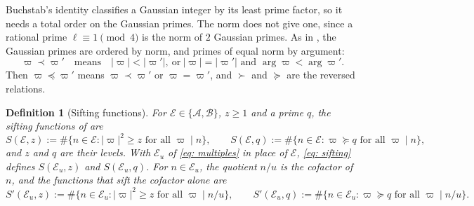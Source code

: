 \documentclass{article}
\numberwithin{equation}{section}
\newtheorem{definition}{Definition}
\newcommand{\Ge}{\geqslant}
\begin{document}
Buchstab's identity classifies a Gaussian integer by its least prime factor, so it needs a total order on the Gaussian primes. The norm does not give one, since a rational prime $\ell \equiv 1 \pmod 4$ is the norm of $2$ Gaussian primes. As in \citet[p.~122]{harman2001gaussian}, the Gaussian primes are ordered by norm, and primes of equal norm by argument:
\begin{equation}
\label{eq: order}
\varpi \prec \varpi' \quad \text{means} \quad |\varpi| < |\varpi'|, \ \text{or} \ |\varpi| = |\varpi'| \text{ and } \arg \varpi < \arg \varpi'.
\end{equation}
Then $\varpi \preccurlyeq \varpi'$ means $\varpi \prec \varpi'$ or $\varpi = \varpi'$, and $\succ$ and $\succcurlyeq$ are the reversed relations.

\begin{definition}[Sifting functions]
\label{def: sifting}
For $\mathcal{E} \in \{\mathcal{A}, \mathcal{B}\}$, $z \Ge 1$ and a prime $q$, the \emph{sifting functions} of \citet[p.~121]{harman2001gaussian} are
\begin{equation}
\label{eq: sifting}
S(\mathcal{E}, z) := \#\{ n \in \mathcal{E} : |\varpi|^2 \Ge z \text{ for all } \varpi \mid n \}, \qquad S(\mathcal{E}, q) := \#\{ n \in \mathcal{E} : \varpi \succcurlyeq q \text{ for all } \varpi \mid n \},
\end{equation}
and $z$ and $q$ are their \emph{levels}. With $\mathcal{E}_u$ of \eqref{eq: multiples} in place of $\mathcal{E}$, \eqref{eq: sifting} defines $S(\mathcal{E}_u, z)$ and $S(\mathcal{E}_u, q)$. For $n \in \mathcal{E}_u$, the quotient $n/u$ is the \emph{cofactor} of $n$, and the functions that sift the cofactor alone are
\begin{equation}
\label{eq: cofactor sieve}
S'(\mathcal{E}_u, z) := \#\{ n \in \mathcal{E}_u : |\varpi|^2 \Ge z \text{ for all } \varpi \mid n/u \}, \qquad S'(\mathcal{E}_u, q) := \#\{ n \in \mathcal{E}_u : \varpi \succcurlyeq q \text{ for all } \varpi \mid n/u \}.
\end{equation}
\end{definition}
\end{document}
